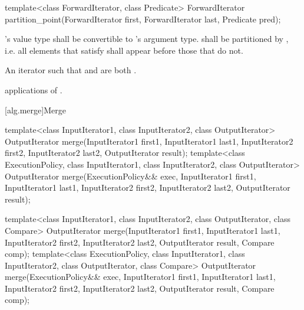 %
\begin{itemdecl}
template<class ForwardIterator, class Predicate>
  ForwardIterator partition_point(ForwardIterator first,
                                  ForwardIterator last,
                                  Predicate pred);
\end{itemdecl}


\begin{itemdescr}
\pnum
\requires {}'s value type shall be convertible to 's argument type.  shall be partitioned by , i.e. all elements that satisfy  shall appear before those that do not.

\pnum
\returns An iterator  such that  and  are both .

\pnum
\complexity {} applications of .
\end{itemdescr}

[alg.merge]{Merge}

%
\begin{itemdecl}
template<class InputIterator1, class InputIterator2,
         class OutputIterator>
  OutputIterator
    merge(InputIterator1 first1, InputIterator1 last1,
          InputIterator2 first2, InputIterator2 last2,
          OutputIterator result);
template<class ExecutionPolicy, class InputIterator1, class InputIterator2,
         class OutputIterator>
  OutputIterator
    merge(ExecutionPolicy&& exec,
          InputIterator1 first1, InputIterator1 last1,
          InputIterator2 first2, InputIterator2 last2,
          OutputIterator result);

template<class InputIterator1, class InputIterator2,
         class OutputIterator, class Compare>
  OutputIterator
    merge(InputIterator1 first1, InputIterator1 last1,
          InputIterator2 first2, InputIterator2 last2,
          OutputIterator result, Compare comp);
template<class ExecutionPolicy, class InputIterator1, class InputIterator2,
         class OutputIterator, class Compare>
  OutputIterator
    merge(ExecutionPolicy&& exec,
          InputIterator1 first1, InputIterator1 last1,
          InputIterator2 first2, InputIterator2 last2,
          OutputIterator result, Compare comp);
\end{itemdecl}

